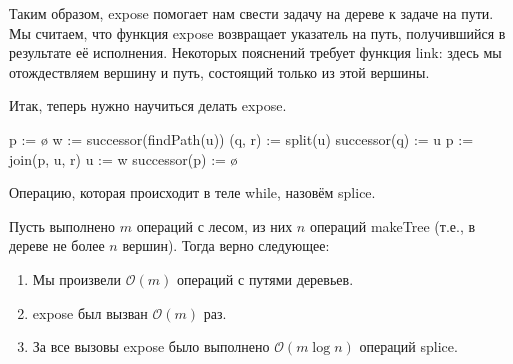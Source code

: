 Таким образом, expose помогает нам свести задачу на дереве к задаче на пути. Мы считаем, что функция expose возвращает указатель на путь, получившийся в результате её исполнения. Некоторых пояснений требует функция link: здесь мы отождествляем вершину и путь, состоящий только из этой вершины.

Итак, теперь нужно научиться делать expose.

\begin{algorithmic}[1]

		\State p := \o {}
			\State w := successor(findPath(u)) 
			\State (q, r) := split(u) 
			 
				\State successor(q) := u 
			\EndIf
			\State p := join(p, u, r) 
			\State u := w 
		\EndWhile
		\State successor(p) := \o
	\EndProcedure

\end{algorithmic}

Операцию, которая происходит в теле while, назовём splice.

\begin{theorem}
Пусть выполнено $m$ операций с лесом, из них $n$ операций makeTree (т.е., в дереве не более $n$ вершин). Тогда верно следующее:

\begin{enumerate}
    \item Мы произвели $\mathcal{O}(m)$ операций с путями деревьев.
    \item expose был вызван $\mathcal{O}(m)$ раз.
    \item За все вызовы expose было выполнено $\mathcal{O}(m \log{n})$ операций splice.
\end{enumerate}
\end{theorem}

